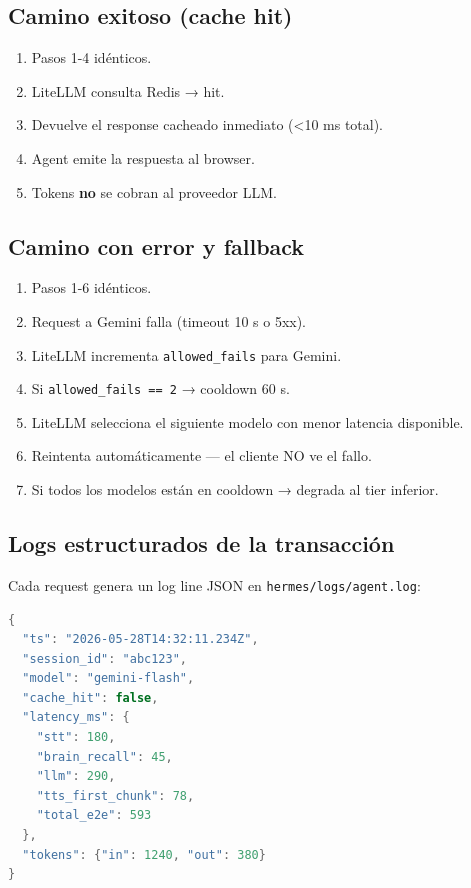 \documentclass[11pt,a4paper]{article}
\begin{document}
\subsection{Camino exitoso (cache hit)}

\begin{enumerate}[leftmargin=*,itemsep=2pt]
\item Pasos 1-4 idénticos.
\item LiteLLM consulta Redis → hit.
\item Devuelve el response cacheado inmediato (\textless 10 ms total).
\item Agent emite la respuesta al browser.
\item Tokens \textbf{no} se cobran al proveedor LLM.
\end{enumerate}

\subsection{Camino con error y fallback}

\begin{enumerate}[leftmargin=*,itemsep=2pt]
\item Pasos 1-6 idénticos.
\item Request a Gemini falla (timeout 10 s o 5xx).
\item LiteLLM incrementa \texttt{allowed\_fails} para Gemini.
\item Si \texttt{allowed\_fails == 2} → cooldown 60 s.
\item LiteLLM selecciona el siguiente modelo con menor latencia disponible.
\item Reintenta automáticamente — el cliente NO ve el fallo.
\item Si todos los modelos están en cooldown → degrada al tier inferior.
\end{enumerate}

\subsection{Logs estructurados de la transacción}

Cada request genera un log line JSON en \texttt{hermes/logs/agent.log}:

\begin{lstlisting}[language=java]
{
  "ts": "2026-05-28T14:32:11.234Z",
  "session_id": "abc123",
  "model": "gemini-flash",
  "cache_hit": false,
  "latency_ms": {
    "stt": 180,
    "brain_recall": 45,
    "llm": 290,
    "tts_first_chunk": 78,
    "total_e2e": 593
  },
  "tokens": {"in": 1240, "out": 380}
}
\end{lstlisting}
\end{document}
